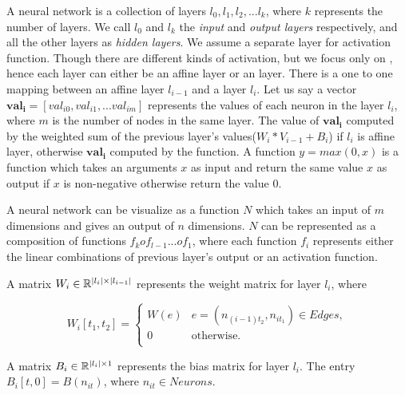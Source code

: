 A neural network is a collection of layers $l_0, l_1, l_2, ... l_k$, where $k$ represents the number of layers.
We call $l_0$ and $l_k$ the {\em input} and {\em output layers} respectively, and all the other layers 
as {\em hidden layers}. We assume a separate layer for activation function. Though there are different kinds of
activation, but we focus only on \relu{}, hence each layer can either be an affine layer or an \relu{} layer.
There is a one to one mapping between an affine layer $l_{i-1}$ and a \relu{} layer $l_i$. 
Let us say a vector $\boldsymbol{val_i} = [val_{i0}, val_{i1}, ... val_{im}]$ represents the values of each neuron 
in the layer $l_i$, where $m$ is the number of nodes in the same layer.
The value of $\boldsymbol{val_i}$ computed by the weighted sum of the previous layer's values($W_i * V_{i-1} + B_i$)
if $l_i$ is affine layer, otherwise $\boldsymbol{val_i}$ computed by the \relu{} function. 
A function $y = max(0,x)$ is a \relu{} function which takes an arguments $x$ as input and return the
same value $x$ as output if $x$ is non-negative otherwise return the value 0. 

A neural network can be visualize as a function $N$ which takes an input of $m$ dimensions and gives an 
output of $n$ dimensions. $N$ can be represented as a composition of functions $f_k o f_{l-1} ... o f_1$,
where each function $f_i$ represents either the linear combinations of previous layer's
output or an activation function. 



\begin{df}
  A matrix $W_i \in \mathbb{R}^{|l_i|\times|l_{i-1}|}$ represents the weight matrix for layer $l_i$, where
  
    $$
    W_i[t_1, t_2] = 
    \begin{cases}
      W(e) & e=(n_{(i-1)t_2}, n_{it_1}) \in Edges,\\
      0 & \text{otherwise.}\\
    \end{cases}
    $$
\end{df}

\begin{df}
    A matrix $B_i \in \mathbb{R}^{|l_i|\times 1}$ represents the bias matrix for layer $l_i$. The entry $B_i[t,0] = B(n_{it})$, where $n_{it} \in Neurons$. 
\end{df}



